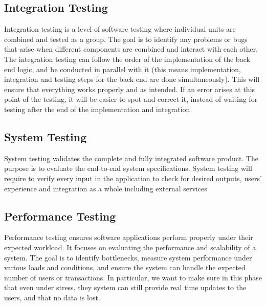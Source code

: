 \subsection{Integration Testing}
Integration testing is a level of software testing where individual units are combined and tested as a group. 
The goal is to identify any problems or bugs that arise when different components are combined and interact with each other.\newline
The integration testing can follow the order of the implementation of the back end logic, and be conducted in parallel with it 
(this means implementation, integration and testing steps for the back end are done simultaneously). 
This will ensure that everything works properly and as intended. If an error arises at this point of the testing, it will be easier to spot and correct it, 
instead of waiting for testing after the end of the implementation and integration.

\subsection{System Testing}
System testing validates the complete and fully integrated software product. 
The purpose is to evaluate the end-to-end system specifications. 
System testing will require to verify every input in the application to check for desired outputs, 
users’ experience and integration as a whole including external services

\subsection{Performance Testing}
Performance testing ensures software applications perform properly under their expected workload. 
It focuses on evaluating the performance and scalability of a system. 
The goal is to identify bottlenecks, measure system performance under various loads and conditions, 
and ensure the system can handle the expected number of users or transactions. 
In particular, we want to make sure in this phase that even under stress, they system can still provide real time updates to the users, and that no data is lost.

